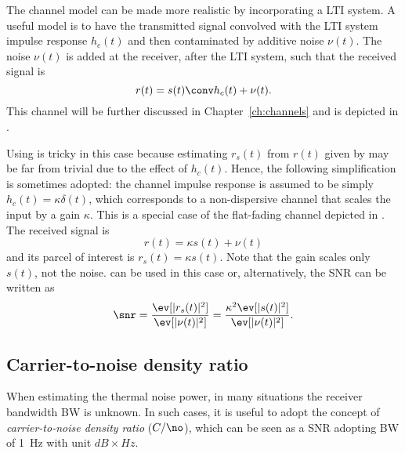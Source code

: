
The channel model can be made more realistic by incorporating a LTI system. A useful model is to have the transmitted signal convolved with the LTI system impulse response $h_c(t)$ and then contaminated by additive noise $\nu(t)$. The noise $\nu(t)$ is added at the receiver, after the LTI system, such that the received signal is
\begin{equation}
r(t) = s(t) \conv h_c(t) + \nu(t).
\label{eq:ltiGaussianChannelPreliminar}
\end{equation}
This channel will be further discussed in Chapter~\ref{ch:channels} and is depicted in . 

Using  is tricky in this case because estimating $r_s(t)$ from $r(t)$ given by  may be far from trivial due to the effect of $h_c(t)$. Hence, the following simplification is sometimes adopted: the channel impulse response is assumed to be simply $h_c(t) = \kappa \delta(t)$, which corresponds to a non-dispersive channel that scales the input by a gain $\kappa$. This is a special case of the flat-fading channel depicted in . The received signal is
\[
r(t) = \kappa s(t) + \nu(t)
\]
and its parcel of interest is $r_s(t)=\kappa  s(t)$. Note that the gain scales only $s(t)$, not the noise.  can be used in this case or, alternatively, the SNR can be written as
\begin{equation}
\snr = \frac{\ev[|r_s(t)|^2]}{\ev[|\nu(t)|^2]} = \frac{\kappa^2 \ev[|s(t)|^2]}{\ev[|\nu(t)|^2]}.
\label{eq:snrAtReceiver}
\end{equation}

\subsection{Carrier-to-noise density ratio}
\label{sec:cno}

When estimating the thermal noise power, in many situations the receiver bandwidth BW is unknown.
In such cases, it is useful to adopt the concept of \emph{carrier-to-noise density ratio} ($C/\no$), which can be seen as a SNR adopting BW of 1~Hz with
unit $dB \times Hz$.

